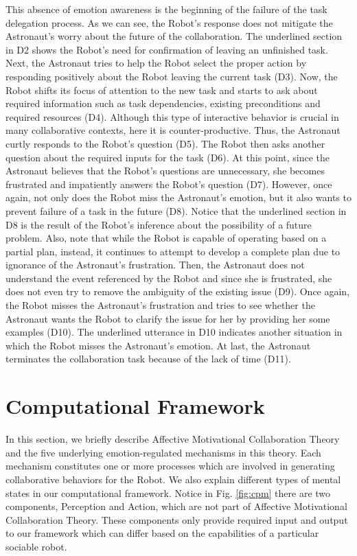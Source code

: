 This absence of emotion awareness is the beginning of the failure of the task
delegation process. As we can see, the Robot's response does not mitigate the
Astronaut's worry about the future of the collaboration. The underlined
section in D2 shows the Robot's need for confirmation of leaving an unfinished
task. Next, the Astronaut tries to help the Robot select the proper action by
responding positively about the Robot leaving the current task (D3). Now, the
Robot shifts its focus of attention to the new task and starts to ask about
required information such as task dependencies, existing preconditions and
required resources (D4). Although this type of interactive behavior is crucial
in many collaborative contexts, here it is counter-productive. Thus, the
Astronaut curtly responds to the Robot's question (D5). The Robot then asks
another question about the required inputs for the task (D6). At this point,
since the Astronaut believes that the Robot's questions are unnecessary, she
becomes frustrated and impatiently answers the Robot's question (D7). However,
once again, not only does the Robot miss the Astronaut's emotion, but it also
wants to prevent failure of a task in the future (D8). Notice that the
underlined section in D8 is the result of the Robot's inference about the
possibility of a future problem. Also, note that while the Robot is capable of
operating based on a partial plan, instead, it continues to attempt to develop a
complete plan due to ignorance of the Astronaut's frustration. Then, the
Astronaut does not understand the event referenced by the Robot and since she is
frustrated, she does not even try to remove the ambiguity of the existing issue
(D9). Once again, the Robot misses the Astronaut's frustration and tries to see
whether the Astronaut wants the Robot to clarify the issue for her by providing
her some examples (D10). The underlined utterance in D10 indicates another
situation in which the Robot misses the Astronaut's emotion. At last, the
Astronaut terminates the collaboration task because of the lack of time (D11).

\section{Computational Framework}
\label{sec:computational-framework}

In this section, we briefly describe Affective Motivational Collaboration
Theory \cite{shayganfar:theory-overview} and the five underlying
emotion-regulated mechanisms in this theory. Each mechanism constitutes one or
more processes which are involved in generating collaborative behaviors for the
Robot. We also explain different types of mental states in our computational
framework. Notice in Fig. \ref{fig:cpm} there are two components, Perception and
Action, which are not part of Affective Motivational Collaboration Theory. These
components only provide required input and output to our framework which can
differ based on the capabilities of a particular sociable robot.

